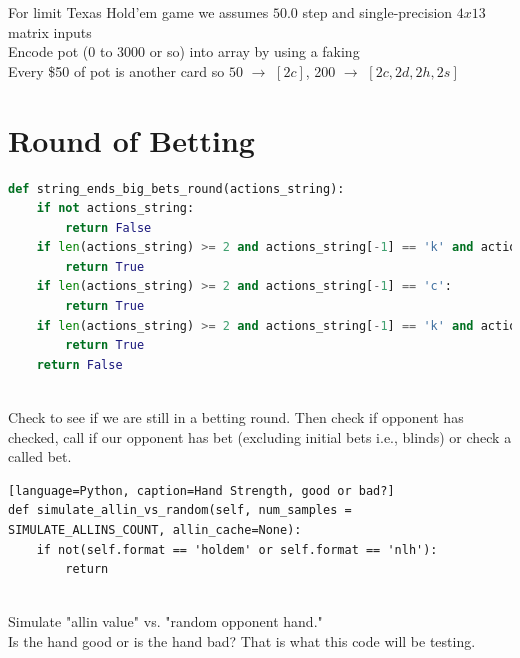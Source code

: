 \documentclass[review]{elsarticle}
\begin{document}
For limit Texas Hold'em game we assumes $50.0$ step and single-precision $4x13$ matrix inputs \\
Encode pot (0 to 3000 or so) into array by using a faking \\
Every \$50 of pot is another card so $50$ $\to$ $[2c]$, 200 $\to$ $[2c, 2d, 2h, 2s]$ \\


\section{Round of Betting}

\begin{lstlisting}[language=Python, caption=Betting Actions]
def string_ends_big_bets_round(actions_string):
    if not actions_string:
        return False
    if len(actions_string) >= 2 and actions_string[-1] == 'k' and actions_string[-2] == 'k':
        return True
    if len(actions_string) >= 2 and actions_string[-1] == 'c':
        return True
    if len(actions_string) >= 2 and actions_string[-1] == 'k' and actions_string[-2] == 'c':
        return True
    return False
\end{lstlisting}
~\cite{moscow25} \\
Check to see if we are still in a betting round. Then check if opponent has checked, call
if our opponent has bet (excluding initial bets i.e., blinds) or check a called bet. \\  


\begin{lstlisting}[language=Python, caption=Hand Strength, good or bad?]
def simulate_allin_vs_random(self, num_samples = SIMULATE_ALLINS_COUNT, allin_cache=None):
    if not(self.format == 'holdem' or self.format == 'nlh'):
        return
\end{lstlisting}
~\cite{moscow25}  \\

Simulate {\ttfamily"}allin value{\ttfamily"} vs. 
{\ttfamily"}random opponent hand.{\ttfamily"}\\
Is the hand good or is the hand bad? That is what this code will be testing. \\
\end{document}
